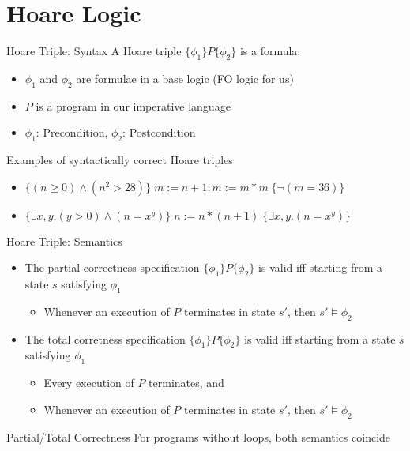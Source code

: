 \documentclass[presentation]{beamer}
\begin{document}
\section{Hoare Logic}
\label{sec:orgf078f3c}
\begin{frame}[label={sec:orgc31ea3b}]{Hoare Triple: Syntax}
A \alert{Hoare triple} \(\{\phi_1\}P\{\phi_2\}\) is a formula:
\begin{itemize}
\item \(\phi_1\) and \(\phi_2\) are formulae in a base logic (FO logic for us)
\item \(P\) is a program in our imperative language
\item \(\phi_1\): \alert{Precondition}, \(\phi_2\): \alert{Postcondition}
\end{itemize}


Examples of syntactically correct Hoare triples
\begin{itemize}
\item \(\{(n\ge 0)\wedge(n^2>28)\}\;m:=n+1; m:=m*m\;\{\neg(m=36)\}\)
\item \(\{\exists x,y.(y>0)\wedge(n=x^y)\}\;n:=n*(n+1)\;\{\exists x,y.(n=x^y)\}\)
\end{itemize}
\end{frame}
\begin{frame}[label={sec:org147f379}]{Hoare Triple: Semantics}
\begin{itemize}
\item The \alert{partial correctness} specification \(\{\phi_1\}P\{\phi_2\}\) is valid iff starting from a state \(s\)
satisfying \(\phi_1\)
\begin{itemize}
\item Whenever an execution of \(P\) terminates in state \(s'\), then \(s'\vDash\phi_2\)
\end{itemize}
\item The \alert{total corretness} specification \(\{\phi_1\}P\{\phi_2\}\) is valid iff starting from a state \(s\)
satisfying \(\phi_1\)
\begin{itemize}
\item Every execution of \(P\) terminates, and
\item Whenever an execution of \(P\) terminates in state \(s'\), then \(s'\vDash\phi_2\)
\end{itemize}
\end{itemize}


\begin{block}{Partial/Total Correctness}
For programs without loops, both semantics coincide
\end{block}
\end{frame}
\end{document}
